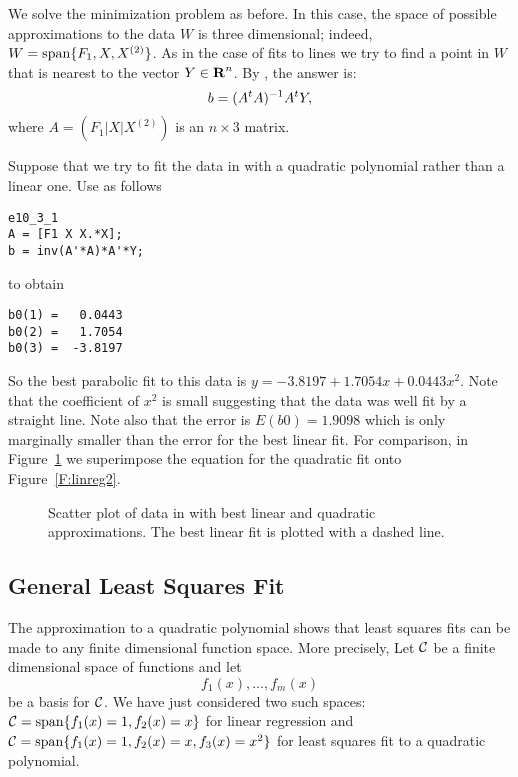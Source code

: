 We solve the minimization problem as before.  In this case, the space of
possible approximations to the data $W$ is three dimensional; indeed,
$W={\rm span}\{F_1,X,X^{(2)}\}$.  As in the case of fits to lines we try to
find a point in $W$ that is nearest to the vector $Y\in\mbox{$\bf{R}$}^n$.  By
, the answer is:
\[
b = (A^tA)^{-1} A^tY,
\]
where $A=(F_1|X|X^{(2)})$ is an $n\times 3$ matrix.

Suppose that we try to fit the data in  with a quadratic
polynomial rather than a linear one.   Use \Matlab as follows
\begin{verbatim}
e10_3_1
A = [F1 X X.*X];
b = inv(A'*A)*A'*Y;
\end{verbatim}
to obtain
\begin{verbatim}
b0(1) =   0.0443
b0(2) =   1.7054
b0(3) =  -3.8197
\end{verbatim}
So the best parabolic fit
to this data is $y=-3.8197+1.7054x+0.0443x^2$.
Note that the coefficient of $x^2$ is small suggesting that the data was
well fit by a straight line.  Note also that the error is
$E(b0)=1.9098$ which
is only marginally smaller than the error for the best linear fit.  For
comparison, in Figure~\ref{F:linreg3} we superimpose the equation for the
quadratic fit onto Figure~\ref{F:linreg2}.
\begin{figure}[htb]
     \centerline{%
     }
     \caption{Scatter plot of data in \protect{} with best
	linear and quadratic approximations.  The best linear fit is plotted
	with a dashed line.}
     \label{F:linreg3}
\end{figure}



\subsection*{General Least Squares Fit}

The approximation to a quadratic polynomial shows that least squares
fits can be made to any finite dimensional
function space.  More precisely,
Let ${\cal C}$ be a finite dimensional space of functions and let
\[
f_1(x),\ldots,f_m(x)
\]
be a basis for ${\cal C}$.  We have just considered two such spaces:
${\cal C}={\rm span}\{f_1(x)=1,f_2(x)=x\}$ for
linear regression and
${\cal C}={\rm span}\{f_1(x)=1,f_2(x)=x,f_3(x)=x^2\}$ for
least squares fit to a
quadratic polynomial.

